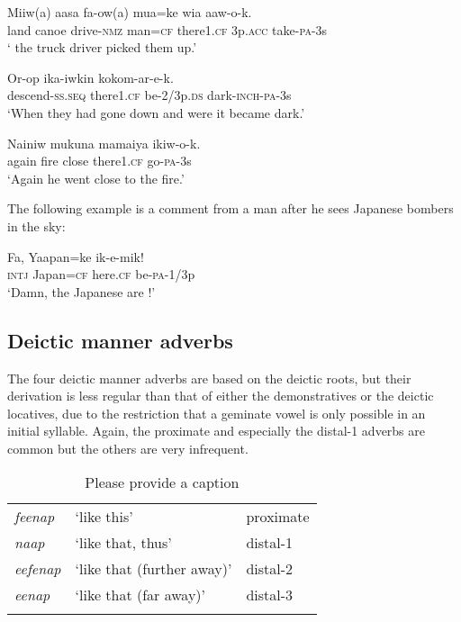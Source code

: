 \ea%
\label{ex:3:x1146}
\gll Miiw(a) aasa fa-ow(a) mua=ke  wia aaw-o-k. \\
land canoe drive-\textsc{nmz} man=\textsc{cf} there1.\textsc{cf} 3p.\textsc{acc} take-\textsc{pa}-3s\\
\glt` the truck driver picked them up.'
\z

\ea%
\label{ex:3:x1199}
\gll Or-op  ika-iwkin kokom-ar-e-k. \\
descend-\textsc{ss}.\textsc{seq} there1.\textsc{cf} be-2/3p.\textsc{ds} dark-\textsc{inch}-\textsc{pa}-3s\\
\glt`When they had gone down and were  it became dark.'
\z

\ea%
\label{ex:3:x1200}
\gll Nainiw mukuna mamaiya  ikiw-o-k. \\
again fire close there1.\textsc{cf} go-\textsc{pa}-3s\\
\glt`Again he went  close to the fire.'
\z

The following example is a comment from a man after he sees Japanese bombers in the sky:

\ea%
\label{ex:3:x1572}
\gll Fa, Yaapan=ke  ik-e-mik! \\
\textsc{intj} Japan=\textsc{cf} here.\textsc{cf} be-\textsc{pa}-1/3p\\
\glt`Damn, the Japanese are !'
\z

\subsection{Deictic manner adverbs}\label{sec:3.6.4}
{}
The four deictic manner adverbs are based on the deictic roots, but their derivation is less regular than that of either the demonstratives or the deictic locatives, due to the restriction that a geminate vowel is only possible in an initial syllable. Again, the proximate and especially the distal-1 adverbs are common but the others are very infrequent.

\begin{table}
\caption{Please provide a caption}
 
\begin{tabular}{>{\itshape}lll}
\mytoprule
feenap &`like this' &proximate\\
naap &`like that, thus' &distal-1\\
eefenap &`like that (further away)' &distal-2\\
eenap &`like that (far away)' &distal-3\\
\mybottomrule
\end{tabular}
\end{table}


